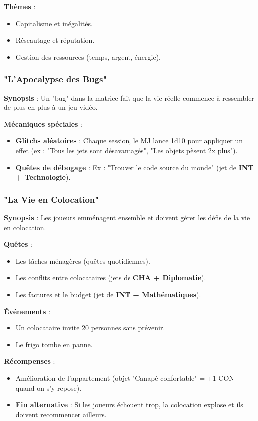 \documentclass[11pt, a4paper]{article}
\begin{document}
\textbf{Thèmes} :
\begin{itemize}
    \item Capitalisme et inégalités.
    \item Réseautage et réputation.
    \item Gestion des ressources (temps, argent, énergie).
\end{itemize}

\subsubsection{"L'Apocalypse des Bugs"}
\textbf{Synopsis} : Un "bug" dans la matrice fait que la vie réelle commence à ressembler de plus en plus à un jeu vidéo.

\textbf{Mécaniques spéciales} :
\begin{itemize}
    \item \textbf{Glitchs aléatoires} : Chaque session, le MJ lance 1d10 pour appliquer un effet (ex : "Tous les jets sont désavantagés", "Les objets pèsent 2x plus").
    \item \textbf{Quêtes de débogage} : Ex : "Trouver le code source du monde" (jet de \textbf{INT + Technologie}).
\end{itemize}

\subsubsection{"La Vie en Colocation"}
\textbf{Synopsis} : Les joueurs emménagent ensemble et doivent gérer les défis de la vie en colocation.

\textbf{Quêtes} :
\begin{itemize}
    \item Les tâches ménagères (quêtes quotidiennes).
    \item Les conflits entre colocataires (jets de \textbf{CHA + Diplomatie}).
    \item Les factures et le budget (jet de \textbf{INT + Mathématiques}).
\end{itemize}

\textbf{Événements} :
\begin{itemize}
    \item Un colocataire invite 20 personnes sans prévenir.
    \item Le frigo tombe en panne.
\end{itemize}

\textbf{Récompenses} :
\begin{itemize}
    \item Amélioration de l'appartement (objet "Canapé confortable" = +1 CON quand on s'y repose).
    \item \textbf{Fin alternative} : Si les joueurs échouent trop, la colocation explose et ils doivent recommencer ailleurs.
\end{itemize}
\end{document}
